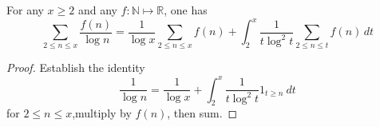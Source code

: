 \begin{sublemma}
\label{Mertens-integral-ident}
\leanok
For any $x \geq 2$ and any $f : {\mathbb N} \mapsto {\mathbb R}$, one has
$$ \sum_{2 \leq n \leq x} \frac{f(n)}{\log n} = \frac{1}{\log x} \sum_{2 \leq n \leq x} f(n) + \int_2^x \frac{1}{t \log^2 t} \sum_{2 \leq n \leq t} f(n) \, dt$$
\end{sublemma}
\begin{proof}
\leanok
Establish the identity
  $$ \frac{1}{\log n} = \frac{1}{\log x} + \int_2^x \frac{1}{t \log^2 t} 1_{t \geq n}\ dt$$
  for $2 \leq n \leq x$,multiply by $f(n)$, then sum.
\end{proof}
